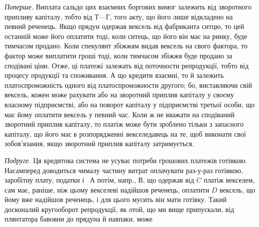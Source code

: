 \emph{Поперше.} Виплата сальдо цих взаємних боргових вимог залежить від
зворотного припливу капіталу, тобто від $Т — Г$, того акту, що його лише відкладено
на певний реченець. Якщо прядун одержав вексель від фабриканта ситцю,
то цей останній може його оплатити тоді, коли ситець, що його він має на
ринку, буде тимчасом продано. Коли спекулянт збіжжям видав вексель на свого
фактора, то фактор може виплатити гроші тоді, коли тимчасом збіжжя буде продано
за сподівані ціни. Отже, ці платежі залежать від поточности репродукції,
тобто від процесу продукції та споживання. А що кредити взаємні, то й залежить
платоспроможність одного від платоспроможности другого; бо, виставляючи
свій вексель, кожен може рахувати або на зворотний приплив капіталу у своєму
власному підприємстві, або на поворот капіталу у підприємстві третьої особи,
що має йому оплатити вексель у певний час. Коли ж не вважати на сподіваний
зворотний приплив капіталу, то платіж може бути зроблено тільки з запасного
капіталу, що його має в розпорядженні векселедавець на те, щоб виконати свої
зобов’язання, якщо зворотний приплив капіталу затримується.

\emph{Подруге.} Ця кредитова система не усуває потреби грошових платежів
готівкою. Насамперед доводиться чималу частину витрат оплачувати раз-у-раз
готівкою, заробітну плату, податки і~ А потім, напр., $В$, що одержав від
$C$ платіж векселем, сам має, раніше, ніж цьому векселеві надійшов реченець,
оплатити $D$ вексель, що йому вже надійшов реченець, і для цього мусить
він мати готівку. Такий досконалий кругооборот репродукції, як отой, що ми
вище припускали, від плянтатора бавовни до прядуна й навпаки, може
\parbreak{}  %
